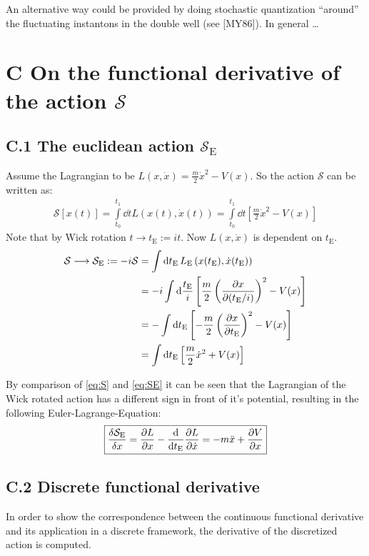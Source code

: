 \documentclass[11pt,a4paper]{scrartcl}
\newcommand{\action}{\ensuremath{\mathcal{S}}}
\newcommand{\SE}{\ensuremath{\mathcal{S}_{\mathrm{E}}}}
\newcommand{\tE}{\ensuremath{t_{\mathrm{E}}}}
\begin{document}
An alternative way could be provided by doing stochastic quantization
\enquote{around} the fluctuating instantons in the double well (see [MY86]). In general \dots




\section*{C On the functional derivative of the action \action}
\subsection*{C.1 The euclidean action \SE}
\label{app:derivSE}
Assume the Lagrangian to be $L(x,\dot{x})=\frac{m}{2} \dot{x}^2-V(x)$. So the
action $\action$ can be written as:
\begin{align}
    \action\left[x(t)\right] = \int\limits_{t_0}^{t_1}\dd{t}L\left(x(t), \dot{x}(t)\right) = \int\limits_{t_0}^{t_1}\dd{t}\left[\frac{m}{2}\dot{x}^2-V(x)\right]\label{eq:S}
\end{align}
Note that by Wick rotation $t\longrightarrow \tE:=it$. Now $L(x,\dot{x})$ is
dependent on \tE.
\begin{align}
    \action\longrightarrow\SE:=-i\action
    &=\int\dd{\tE}L_\mathrm{E}\left(x(t_\mathrm{E}),
    \dot{x}(t_\mathrm{E})\right) \nonumber \\
    &=-i\int\dd\frac{\tE}{i}\left[\frac{m}{2}\left(\pdv{x}{(\tE/i)}\right)^2-V(x)\right]
    \nonumber \\
    &=-\int\dd\tE\left[-\frac{m}{2}\left(\pdv{x}{\tE}\right)^2-V(x)\right]
    \nonumber \\
    &=\int\dd\tE\left[\frac{m}{2}\dot{x}^2+V(x)\right] \label{eq:SE}
\end{align}

By comparison of \cref{eq:S} and \cref{eq:SE} it can be seen that the
Lagrangian of the Wick rotated action has a different sign in front of it's
potential, resulting in the following Euler-Lagrange-Equation:
\begin{equation}
    \boxed{\fdv{\SE}{x}=\pdv{L}{x}-\dv{\tE}\pdv{L}{\dot{x}}=-m\ddot{x}+\pdv{V}{x}}
    \label{eq:EuclideanEulerLagrange}
\end{equation}


\subsection*{C.2 Discrete functional derivative}
\label{app:deriv-discrete}
In order to show the correspondence between the continuous functional
derivative and its application in a discrete framework, the derivative of the
discretized action is computed.
\end{document}
